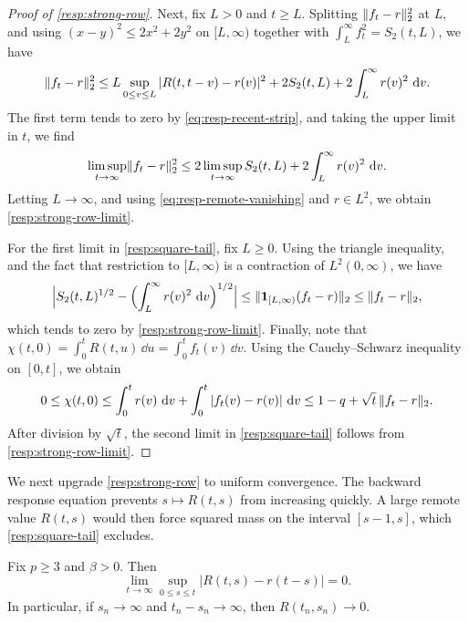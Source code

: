 \begin{proof}[Proof of \cref{resp:strong-row}]
Next, fix $L>0$ and $t\ge L$. Splitting $\lVert f_t-r\rVert_2^2$ at $L$, and using $(x-y)^2\le2x^2+2y^2$ on $[L,\infty)$ together with $\int_L^\infty f_t^2=S_2(t,L)$, we have
\[
 \lVert f_t-r\rVert_2^2
 \le L\sup_{0\le v\le L}|R(t,t-v)-r(v)|^2+2S_2(t,L)+2\int_L^\infty r(v)^2\,\mathop{}\!\mathrm d v.
\]
The first term tends to zero by \eqref{eq:resp-recent-strip}, and taking the upper limit in $t$, we find
\[
 \limsup_{t\to\infty}\lVert f_t-r\rVert_2^2\le2\limsup_{t\to\infty}S_2(t,L)+2\int_L^\infty r(v)^2\,\mathop{}\!\mathrm d v.
\]
Letting $L\to\infty$, and using \eqref{eq:resp-remote-vanishing} and $r\in L^2$, we obtain \eqref{resp:strong-row-limit}.

For the first limit in \eqref{resp:square-tail}, fix $L\ge0$. Using the triangle inequality, and the fact that restriction to $[L,\infty)$ is a contraction of $L^2(0,\infty)$, we have
\[
 \Bigl|S_2(t,L)^{1/2}-\Bigl(\int_L^\infty r(v)^2\,\mathop{}\!\mathrm d v\Bigr)^{1/2}\Bigr|
 \le\lVert\mathbf1_{[L,\infty)}(f_t-r)\rVert_2\le\lVert f_t-r\rVert_2,
\]
which tends to zero by \eqref{resp:strong-row-limit}. Finally, note that $\chi(t,0)=\int_0^tR(t,u)\,\dd u=\int_0^tf_t(v)\,\dd v$. Using the Cauchy--Schwarz inequality on $[0,t]$, we obtain
\[
 0\le\chi(t,0)\le\int_0^tr(v)\,\mathop{}\!\mathrm d v+\int_0^t|f_t(v)-r(v)|\,\mathop{}\!\mathrm d v\le1-q+\sqrt t\,\lVert f_t-r\rVert_2.
\]
After division by $\sqrt t$, the second limit in \eqref{resp:square-tail} follows from \eqref{resp:strong-row-limit}.
\end{proof}

We next upgrade \cref{resp:strong-row} to uniform convergence. The backward response equation prevents $s\mapsto R(t,s)$ from increasing quickly. A large remote value $R(t,s)$ would then force squared mass on the interval $[s-1,s]$, which \eqref{resp:square-tail} excludes.

\begin{corollary}
\label{resp:uniform-row}
Fix $p\ge3$ and $\beta>0$. Then
\begin{equation}
 \lim_{t\to\infty}\sup_{0\le s\le t}|R(t,s)-r(t-s)|=0.
 \label{resp:uniform-row-limit}
\end{equation}
In particular, if $s_n\to\infty$ and $t_n-s_n\to\infty$, then $R(t_n,s_n)\to0$.
\end{corollary}

